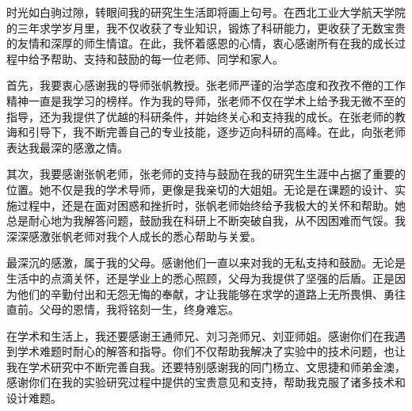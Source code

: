 \documentclass[lang=chs, degree=master, blindreview=false, winfonts=true]{yanputhesis}
\begin{document}
\backmatter                                                 %
%

\begin{acknowledgements}                                    %
时光如白驹过隙，转眼间我的研究生生活即将画上句号。在西北工业大学航天学院的三年求学岁月里，我不仅收获了专业知识，锻炼了科研能力，更收获了无数宝贵的友情和深厚的师生情谊。在此，我怀着感恩的心情，衷心感谢所有在我的成长过程中给予帮助、支持和鼓励的每一位老师、同学和家人。

首先，我要衷心感谢我的导师张帆教授。张老师严谨的治学态度和孜孜不倦的工作精神一直是我学习的榜样。作为我的导师，张老师不仅在学术上给予我无微不至的指导，还为我提供了优越的科研条件，并始终关心和支持我的成长。在张老师的教诲和引导下，我不断完善自己的专业技能，逐步迈向科研的高峰。在此，向张老师表达我最深的感激之情。

其次，我要感谢张帆老师，张老师的支持与鼓励在我的研究生生涯中占据了重要的位置。她不仅是我的学术导师，更像是我亲切的大姐姐。无论是在课题的设计、实施过程中，还是在面对困惑和挫折时，张帆老师始终给予我极大的关怀和帮助。她总是耐心地为我解答问题，鼓励我在科研上不断突破自我，从不因困难而气馁。我深深感激张帆老师对我个人成长的悉心帮助与关爱。


最深沉的感激，属于我的父母。感谢他们一直以来对我的无私支持和鼓励。无论是生活中的点滴关怀，还是学业上的悉心照顾，父母为我提供了坚强的后盾。正是因为他们的辛勤付出和无怨无悔的奉献，才让我能够在求学的道路上无所畏惧、勇往直前。父母的恩情，我将铭刻一生，终身难忘。

在学术和生活上，我还要感谢王通师兄、刘习尧师兄、刘亚师姐。感谢你们在我遇到学术难题时耐心的解答和指导。你们不仅帮助我解决了实验中的技术问题，也让我在学术研究中不断完善自我。还要特别感谢我的同门杨立、文思捷和师弟金澳，感谢你们在我的实验研究过程中提供的宝贵意见和支持，帮助我克服了诸多技术和设计难题。


\end{acknowledgements}
\end{document}
